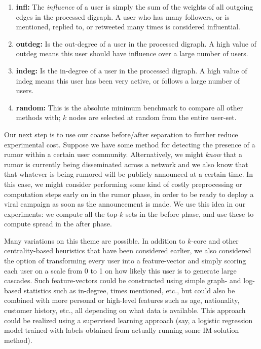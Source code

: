 \documentclass[sigconf]{acmart}
\begin{document}
\begin{enumerate}
\item \textbf{infl: } The \emph{influence} of a user is simply the sum of the weights of all outgoing edges in the processed digraph. A user who has many followers, or is mentioned, replied to, or retweeted many times is considered influential.
\item \textbf{outdeg: } Is the out-degree of a user in the processed digraph. A high value of outdeg means this user should have influence over a large number of users.
\item \textbf{indeg: } Is the in-degree of a user in the processed digraph. A high value of indeg means this user has been very active, or follows a large number of users. 
\item \textbf{random: } This is the absolute minimum benchmark to compare all other methods with; $k$ nodes are selected at random from the entire user-set. 
\end{enumerate}

Our next step is to use our coarse before/after separation to further reduce experimental cost. Suppose we have some method for detecting the presence of a rumor within a certain user community. Alternatively, we might \emph{know} that a rumor is currently being disseminated across a network and we also know that that whatever is being rumored will be publicly announced at a certain time. In this case, we might consider performing some kind of costly preprocessing or computation steps early on in the rumor phase, in order to be ready to deploy a viral campaign as soon as the announcement is made. We use this idea in our experiments: we compute all the top-$k$ sets in the before phase, and use these to compute spread in the after phase. 

Many variations on this theme are possible. In addition to $k$-core and other centrality-based heuristics that have been considered earlier, we also considered the option of transforming every user into a feature-vector and simply scoring each user on a scale from 0 to 1 on how likely this user is to generate large cascades. Such feature-vectors could be constructed using simple graph- and log-based statistics such as in-degree, times mentioned, etc., but could also be combined with more personal or high-level features such as age, nationality, customer history, etc., all depending on what data is available. This approach could be realized using a supervised learning approach (say, a logistic regression model trained with labels obtained from actually running some IM-solution method).
\end{document}
